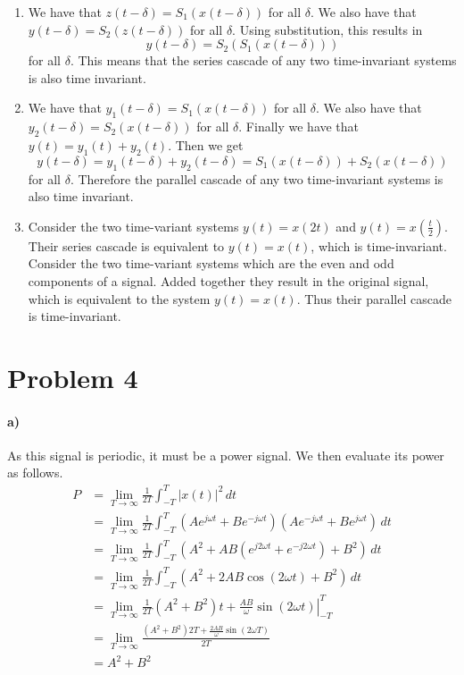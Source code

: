 \documentclass[12pt]{article}
\begin{document}
\begin{enumerate}
    \item We have that \(z(t-\delta)=S_1(x(t-\delta))\) for all \(\delta\). We also have that \(y(t-\delta)=S_2(z(t-\delta))\) for all \(\delta\).
    Using substitution, this results in
    \[y(t-\delta)=S_2(S_1(x(t-\delta)))\]
    for all \(\delta\). This means that the series cascade of any two time-invariant systems is also time invariant.
    \item We have that \(y_1(t-\delta)=S_1(x(t-\delta))\) for all \(\delta\). We also have that \(y_2(t-\delta)=S_2(x(t-\delta))\) for all \(\delta\).
    Finally we have that \(y(t)=y_1(t)+y_2(t)\). Then we get
    \[y(t-\delta)=y_1(t-\delta)+y_2(t-\delta)=S_1(x(t-\delta))+S_2(x(t-\delta))\]
    for all \(\delta\). Therefore the parallel cascade of any two time-invariant systems is also time invariant.
    \item Consider the two time-variant systems \(y(t)=x(2t)\) and \(y(t)=x\left(\frac{t}{2}\right)\). Their series cascade is equivalent to \(y(t)=x(t)\), which is time-invariant.
    Consider the two time-variant systems which are the even and odd components of a signal. Added together they result in the original signal, which is equivalent
    to the system \(y(t)=x(t)\). Thus their parallel cascade is time-invariant.
\end{enumerate}

\section*{Problem 4}

\paragraph{a)}

As this signal is periodic, it must be a power signal. We then evaluate its power as follows.
\begin{align*}
    P&=\lim_{T\to\infty} \frac{1}{2T}\int_{-T}^T |x(t)|^2\,dt\\
    &=\lim_{T\to\infty} \frac{1}{2T}\int_{-T}^T (Ae^{j\omega t}+Be^{-j\omega t})(Ae^{-j\omega t}+Be^{j\omega t})\,dt\\
    &=\lim_{T\to\infty} \frac{1}{2T}\int_{-T}^T (A^2+AB(e^{j2\omega t}+e^{-j2\omega t})+B^2)\,dt\\
    &=\lim_{T\to\infty} \frac{1}{2T}\int_{-T}^T (A^2+2AB\cos(2\omega t)+B^2)\,dt\\
    &=\lim_{T\to\infty} \frac{1}{2T}\left.(A^2+B^2)t + \frac{AB}{\omega}\sin(2\omega t)\right|_{-T}^T\\
    &=\lim_{T\to\infty} \frac{(A^2+B^2)2T+\frac{2AB}{\omega}\sin(2\omega T)}{2T}\\
    &=A^2+B^2
\end{align*}
\end{document}
